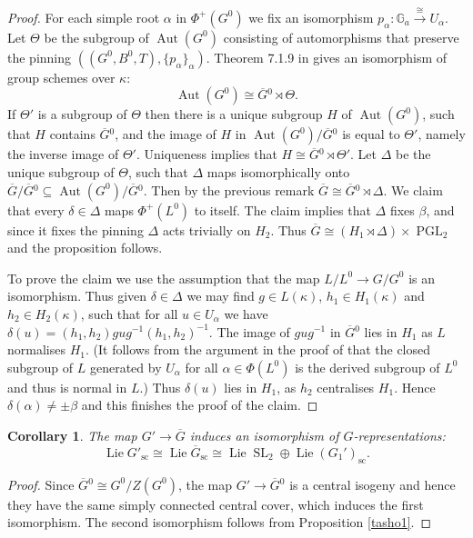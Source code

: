 \documentclass{amsart}
\newtheorem{cor}[prop]{Corollary}
\theoremstyle{definition}
\theoremstyle{remark}
\DeclareMathOperator{\Aut}{Aut}
\DeclareMathOperator{\SL}{SL}
\newcommand{\Ga}{\mathbb G_{a}}
\DeclareMathOperator{\PGL}{PGL}
\DeclareMathOperator{\Lie}{Lie}
\newcommand{\Gbar}{\overline{G}}
\newcommand{\sic}{\operatorname{sc}}
\begin{document}
\begin{proof}
For each simple root $\alpha$  in $\Phi^+(G^0)$ we fix an isomorphism $p_{\alpha}: \Ga \overset{\cong}{\longrightarrow} U_{\alpha}$. Let $\Theta$ be the subgroup of $\Aut(G^0)$ consisting of automorphisms
that preserve the pinning $((G^0, B^0, T), \{p_{\alpha}\}_{\alpha})$. Theorem 7.1.9 in \cite{bcnrd}
gives an isomorphism of group schemes over $\kappa$: 
$$\Aut(G^0)\cong \Gbar{}^0\rtimes \Theta.$$
If $\Theta'$ is a subgroup of $\Theta$ then there is a unique subgroup $H$ of $\Aut(G^0)$, such that $H$ contains $\Gbar{}^0$, and the image of $H$ in $\Aut(G^0)/\Gbar{}^0$ is equal to $\Theta'$, 
namely the inverse image of $\Theta'$. Uniqueness implies that $H\cong \Gbar{}^0\rtimes \Theta'$.
Let $\Delta$ be the unique subgroup of $\Theta$, such that $\Delta$ maps isomorphically onto $\overline{G}/\Gbar{}^0 \subseteq \Aut(G^0)/\Gbar{}^0$. Then by the previous remark 
$\overline{G}\cong \Gbar{}^0\rtimes \Delta$. We claim that every  $\delta\in \Delta$
maps $\Phi^+(L^0)$ to itself. The claim implies that $\Delta$ fixes $\beta$, and since it fixes the 
pinning $\Delta$ acts trivially on $H_2$. Thus $\overline{G}\cong (H_1\rtimes \Delta) \times \PGL_2$
and the proposition follows.

To prove the claim we use the assumption that the map $L/L^0\rightarrow G/G^0$ is an isomorphism. 
Thus given $\delta\in \Delta$ we may find $g\in L(\kappa)$, $h_1\in H_1(\kappa)$ and $h_2\in H_2(\kappa)$, 
such that for all $u\in U_{\alpha}$ we have $\delta(u)= (h_1, h_2) g u g^{-1} (h_1, h_2)^{-1}$.
The image of $gug^{-1}$ in $\Gbar{}^0$ lies in $H_1$ as $L$ normalises $H_1$. (It follows from 
the argument in the proof of \cite[Proposition 14.10 (3)]{borel} that the closed
subgroup of $L$ generated by $U_{\alpha}$ for all $\alpha\in \Phi(L^0)$ is the derived 
subgroup of $L^0$ and thus is normal in $L$.) Thus $\delta(u)$ lies 
in $H_1$, as $h_2$  centralises $H_1$. Hence $\delta(\alpha)\neq \pm \beta$ and this finishes the proof of 
the claim. 
\end{proof}


\begin{cor}\label{tasho2} The map $G'\rightarrow \Gbar$ induces an isomorphism 
of $G$-representations: 
$$ \Lie G'_{\sic} \cong \Lie \Gbar_{\sic} \cong \Lie \SL_2 \oplus \Lie (G_1')_{\sic}.$$
\end{cor} 
\begin{proof} Since $\Gbar{}^0 \cong G^0/Z(G^0)$, the map $G'\rightarrow \Gbar{}^0$
is a central isogeny and hence they have the same simply connected central cover, which 
induces the first isomorphism. The second isomorphism follows from 
Proposition \ref{tasho1}.
\end{proof}
\end{document}
